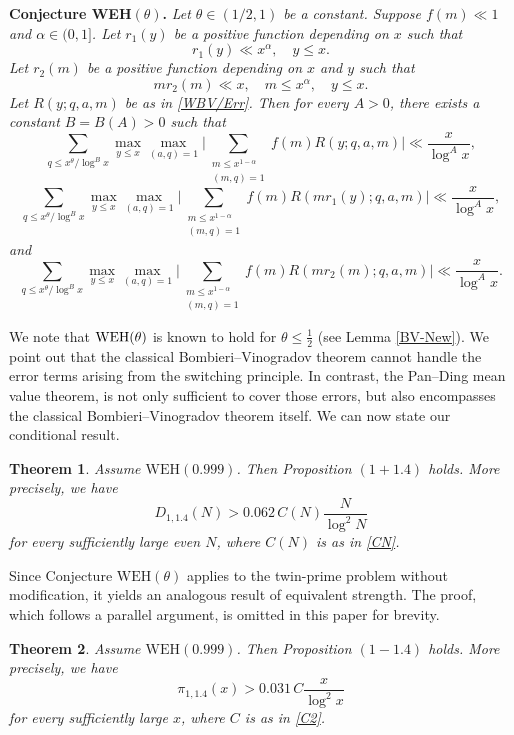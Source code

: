 \documentclass[12pt, a4paper]{amsart}
\def\le{\leqslant}
\theoremstyle{plain}
\newtheorem{theorem}{Theorem}[section]
\theoremstyle{remark}
\numberwithin{equation}{section}
\begin{document}
\medskip
\noindent
{\bf Conjecture WEH$(\theta)$.}\label{EH-New}
{\it
Let $\theta\in (1/2, 1)$ be a constant. Suppose $f(m) \ll 1$ and $\alpha \in (0,1]$. Let $r_1(y)$ be a positive function depending on $x$ such that
$$
r_1(y) \ll x^{\alpha}, \quad y \leqslant x.
$$
Let $r_2(m)$ be a positive function depending on $x$ and $y$ such that
$$
mr_2(m) \ll x, \quad m \leqslant x^{\alpha}, \quad y \leqslant x.
$$
Let $R(y;q,a,m)$ be as in \eqref{WBV/Err}. 
Then for every $A > 0$, there exists a constant $B = B(A) > 0$ such that
\[
\sum_{q \leqslant x^{\theta}/\log^{B} x} 
\max_{y \leqslant x} \max_{(a,q)=1} 
\bigg| \sum_{\substack{m \leqslant x^{1-\alpha} \\ (m,q)=1}} f(m) R(y;q,a,m) \bigg| \ll \frac{x}{\log^A x},
\]
\[
\sum_{q \leqslant x^{\theta}/\log^{B}x} 
\max_{y \leqslant x} \max_{(a,q)=1} \bigg| \sum_{\substack{m \leqslant x^{1-\alpha} \\ (m,q)=1}} f(m) 
R(mr_1(y);q,a,m) \bigg| \ll \frac{x}{\log^A x},
\]
and
\[
\sum_{q \leqslant x^{\theta}/\log^{B}x} 
\max_{y \leqslant x} \max_{(a,q)=1} \bigg| \sum_{\substack{m \leqslant x^{1-\alpha} \\ (m,q)=1}} 
f(m) R(mr_2(m);q,a,m) \bigg| \ll \frac{x}{\log^A x}.
\]
}

We note that ${\rm WEH}(\theta)$ is known to hold for $\theta \le \frac{1}{2}$ (see Lemma \ref{BV-New}). 
We point out that the classical Bombieri--Vinogradov theorem cannot handle the error terms arising from the switching principle. In contrast, the Pan--Ding mean value theorem, is not only sufficient to cover those errors, but also encompasses the classical Bombieri–Vinogradov theorem itself.	
We can now state our conditional result. 

\begin{theorem}\label{Goldbach2}
Assume \(\mathrm{WEH}(0.999)\). Then Proposition \((1+1.4)\) holds. 
More precisely, we have
\[
D_{1,1.4}(N) > 0.062\,C(N) \frac{N}{\log^2 N} 
\]
for every sufficiently large even $N$, where \(C(N)\) is as in \eqref{CN}.
\end{theorem}

Since Conjecture $\mathrm{WEH}(\theta)$ applies to the twin-prime problem without modification, 
it yields an analogous result of equivalent strength. The proof, which follows a parallel argument, is omitted in this paper 
for brevity. 

\begin{theorem}\label{Twin2}
Assume \(\mathrm{WEH}(0.999)\). Then Proposition \((1-1.4)\) holds. More precisely, we have 
\[
\pi_{1,1.4}(x) > 0.031\,C \frac{x}{\log^2 x}
\]
for every sufficiently large $x$, where \(C\) is as in \eqref{C2}.
\end{theorem}
\end{document}
